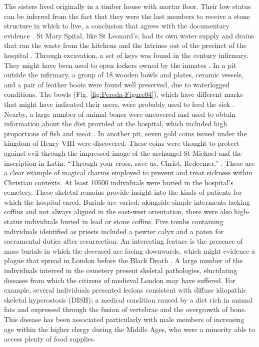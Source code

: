 \documentclass[%
	]{ijsra}
\begin{document}
The sisters lived originally in a timber house with mortar floor. Their low status can be inferred from the fact that they were the last members to receive a stone structure in which to live, a conclusion that agrees with the documentary evidence \parencites[36]{Phillpotts_1997}[51]{Rawcliffe_1999}[151]{Thomas_2002}.
St Mary Spital, like St Leonard’s, had its own water supply and drains that ran the waste from the kitchens and the latrines out of the precinct of the hospital \parencite[151]{Thomas_2002}. 
\IJSRAseparator
{}
Through excavation, a set of keys was found in the  century infirmary. They might have been used to open lockers owned by the inmates \parencite[99]{Thomas_2002}. In a pit outside the infirmary, a group of 18 wooden bowls and plates, ceramic vessels, and a pair of leather boots were found well preserved, due to waterlogged conditions. The bowls (Fig. \ref{fig:Pereda-Figure04}), %
which have different marks that might have indicated their users, were probably used to feed the sick \parencites[68]{Egan_2007}[99]{Thomas_2002}. 
Nearby, a large number of animal bones were uncovered and used to obtain information about the diet provided at the hospital, which included high proportions of fish and meat \parencite[59,113-114]{Phillpotts_1997}.
In another pit, seven gold coins issued under the kingdom of Henry VIII were discovered. These coins were thought to protect against evil through the impressed image of the archangel St Michael and the inscription in Latin: \enquote{Through your cross, save us, Christ, Redeemer.}  \parencite[70]{Egan_2007}. 
These are a clear example of magical charms employed to prevent and treat sickness within Christian contexts. 
At least \num{10500} individuals were buried in the hospital’s cemetery. These skeletal remains provide insight into the kinds of patients for which the hospital cared.  Burials are varied; alongside simple interments lacking coffins and not always aligned in the east-west orientation, there were also high-status individuals buried in lead or stone coffins. Five tombs containing individuals identified as priests included a pewter calyx and a paten for sacramental duties after resurrection. 
An interesting feature is the presence of mass burials in which the deceased are facing downwards, which might evidence a plague that spread in London before the Black Death \parencites[61]{Bowers_2007}[252]{Brodman2009}[73]{Egan_2007}[101]{Thomas 2002}[61]{White_2007}.
A large number of the individuals interred in the cemetery present skeletal pathologies, elucidating diseases from which the citizens of medieval London may have suffered. For example, several individuals presented lesions consistent with diffuse idiopathic skeletal hyperostosis (DISH); a medical condition caused by a diet rich in animal fats and expressed through the fusion of vertebrae and the overgrowth of bone. This disease has been associated particularly with male members of increasing age within the higher clergy during the Middle Ages, who were a minority able to access plenty of food supplies. 
\end{document}
